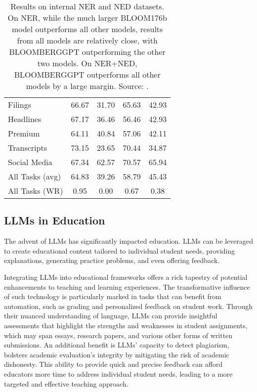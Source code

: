 \begin{table}[h!]
\begin{tabularx}{\textwidth}{Xcccc}
		Filings         & 66.67                 & 31.70             & 65.63                           & 42.93                              \\
		Headlines       & 67.17                 & 36.46             & 56.46                           & 42.93                              \\
		Premium         & 64.11                 & 40.84             & 57.06                           & 42.11                              \\
		Transcripts     & 73.15                 & 23.65             & 70.44                           & 34.87                              \\
		Social Media    & 67.34                 & 62.57             & 70.57                           & 65.94                              \\
		\midrule
		All Tasks (avg) & 64.83                 & 39.26             & 58.79                           & 45.43                              \\
		All Tasks (WR)  & 0.95                  & 0.00              & 0.67                            & 0.38                               \\
		\bottomrule
	\end{tabularx}
	\caption{Results on internal NER and NED datasets. On NER, while the much larger BLOOM176b model outperforms all other models, results from all models are relatively close, with BLOOMBERGGPT outperforming the other two models. On NER+NED, BLOOMBERGGPT outperforms all other models by a large margin. Source: \protect\textcite{wu2023bloomberggpt}.}
	\label{tab:ner_ned_results}
\end{table}

\subsection{LLMs in Education}
\label{subsec:llms-in-education}

The advent of LLMs has significantly impacted education. LLMs can be leveraged to create educational content tailored to individual student needs, providing explanations, generating practice problems, and even offering feedback.

Integrating LLMs into educational frameworks offers a rich tapestry of potential enhancements to teaching and learning experiences.
The transformative influence of such technology is particularly marked in tasks that can benefit from automation, such as grading and personalized feedback on student work.
Through their nuanced understanding of language, LLMs can provide insightful assessments that highlight the strengths and weaknesses in student assignments, which may span essays, research papers, and various other forms of written submissions.
An additional benefit is LLMs' capacity to detect plagiarism, bolsters academic evaluation's integrity by mitigating the risk of academic dishonesty.
This ability to provide quick and precise feedback can afford educators more time to address individual student needs, leading to a more targeted and effective teaching approach.

